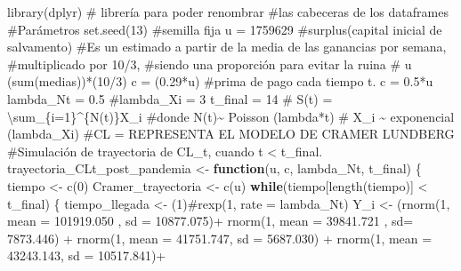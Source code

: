 \documentclass[
  us-letterpaper,
]{scrreprt}
\newenvironment{Shaded}{\begin{snugshade}}{\end{snugshade}}
\newcommand{\AttributeTok}[1]{\textcolor[rgb]{0.40,0.45,0.13}{#1}}
\newcommand{\CommentTok}[1]{\textcolor[rgb]{0.37,0.37,0.37}{#1}}
\newcommand{\ControlFlowTok}[1]{\textcolor[rgb]{0.00,0.23,0.31}{\textbf{#1}}}
\newcommand{\DecValTok}[1]{\textcolor[rgb]{0.68,0.00,0.00}{#1}}
\newcommand{\FloatTok}[1]{\textcolor[rgb]{0.68,0.00,0.00}{#1}}
\newcommand{\FunctionTok}[1]{\textcolor[rgb]{0.28,0.35,0.67}{#1}}
\newcommand{\NormalTok}[1]{\textcolor[rgb]{0.00,0.23,0.31}{#1}}
\newcommand{\OtherTok}[1]{\textcolor[rgb]{0.00,0.23,0.31}{#1}}
\newcommand{\SpecialCharTok}[1]{\textcolor[rgb]{0.37,0.37,0.37}{#1}}
\theoremstyle{plain}
\theoremstyle{plain}
\theoremstyle{definition}
\theoremstyle{remark}
\begin{document}
\begin{Shaded}
\begin{Highlighting}[]
\FunctionTok{library}\NormalTok{(dplyr) }\CommentTok{\# librería para poder renombrar }
\CommentTok{\#las cabeceras de los dataframes}
\CommentTok{\#Parámetros}
\FunctionTok{set.seed}\NormalTok{(}\DecValTok{13}\NormalTok{) }\CommentTok{\#semilla fija}
\NormalTok{u }\OtherTok{=} \DecValTok{1759629} \CommentTok{\#surplus(capital inicial de salvamento)}
\CommentTok{\#Es un estimado a partir de la media de las ganancias por semana, }
\CommentTok{\#multiplicado por 10/3, }
\CommentTok{\#siendo una proporción para evitar la ruina}
\CommentTok{\# u (sum(medias))*(10/3)}
\NormalTok{c }\OtherTok{=}\NormalTok{ (}\FloatTok{0.29}\SpecialCharTok{*}\NormalTok{u) }\CommentTok{\#prima de pago cada tiempo t. c = 0.5*u}
\NormalTok{lambda\_Nt }\OtherTok{=} \FloatTok{0.5}
\CommentTok{\#lambda\_Xi = 3}
\NormalTok{t\_final }\OtherTok{=} \DecValTok{14}
\CommentTok{\# S(t) = \textbackslash{}sum\_\{i=1\}\^{}\{N(t)\}X\_i}
\CommentTok{\#donde N(t)\textasciitilde{} Poisson (lambda*t)}
\CommentTok{\# X\_i \textasciitilde{} exponencial (lambda\_Xi)}
\CommentTok{\#CL = REPRESENTA EL MODELO DE CRAMER LUNDBERG}
\CommentTok{\#Simulación de trayectoria de CL\_t, cuando t \textless{} t\_final.}
\NormalTok{trayectoria\_CLt\_post\_pandemia }\OtherTok{\textless{}{-}} \ControlFlowTok{function}\NormalTok{(u, c, lambda\_Nt, t\_final)}
\NormalTok{\{}
\NormalTok{  tiempo }\OtherTok{\textless{}{-}} \FunctionTok{c}\NormalTok{(}\DecValTok{0}\NormalTok{)}
\NormalTok{  Cramer\_trayectoria }\OtherTok{\textless{}{-}} \FunctionTok{c}\NormalTok{(u)}
  \ControlFlowTok{while}\NormalTok{(tiempo[}\FunctionTok{length}\NormalTok{(tiempo)] }\SpecialCharTok{\textless{}}\NormalTok{ t\_final)}
\NormalTok{  \{}
\NormalTok{    tiempo\_llegada }\OtherTok{\textless{}{-}}\NormalTok{ (}\DecValTok{1}\NormalTok{)}\CommentTok{\#rexp(1, rate = lambda\_Nt)}
\NormalTok{    Y\_i }\OtherTok{\textless{}{-}}\NormalTok{  (}\FunctionTok{rnorm}\NormalTok{(}\DecValTok{1}\NormalTok{, }\AttributeTok{mean =} \FloatTok{101919.050}\NormalTok{ , }\AttributeTok{sd =} \FloatTok{10877.075}\NormalTok{)}\SpecialCharTok{+}
             \FunctionTok{rnorm}\NormalTok{(}\DecValTok{1}\NormalTok{, }\AttributeTok{mean =}  \FloatTok{39841.721}\NormalTok{ , }\AttributeTok{sd=} \FloatTok{7873.446}\NormalTok{)  }\SpecialCharTok{+} 
             \FunctionTok{rnorm}\NormalTok{(}\DecValTok{1}\NormalTok{, }\AttributeTok{mean =}   \FloatTok{41751.747}\NormalTok{, }\AttributeTok{sd =} \FloatTok{5687.030}\NormalTok{) }\SpecialCharTok{+} 
             \FunctionTok{rnorm}\NormalTok{(}\DecValTok{1}\NormalTok{, }\AttributeTok{mean =}   \FloatTok{43243.143}\NormalTok{, }\AttributeTok{sd =} \FloatTok{10517.841}\NormalTok{)}\SpecialCharTok{+} 

\end{Highlighting}
\end{Shaded}
\end{document}
